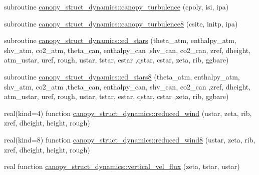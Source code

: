 \begin{DoxyCompactItemize}
\item 
subroutine \hyperlink{namespacecanopy__struct__dynamics_ac7eef4d24c3e07ccb461d418e32d466e}{canopy\+\_\+struct\+\_\+dynamics\+::canopy\+\_\+turbulence} (cpoly, isi, ipa)
\item 
subroutine \hyperlink{namespacecanopy__struct__dynamics_ab65e289b4069536fa3342bc3034db824}{canopy\+\_\+struct\+\_\+dynamics\+::canopy\+\_\+turbulence8} (csite, initp, ipa)
\item 
subroutine \hyperlink{namespacecanopy__struct__dynamics_aecb5209e48d8e43c4c1b214d31d3f7e2}{canopy\+\_\+struct\+\_\+dynamics\+::ed\+\_\+stars} (theta\+\_\+atm, enthalpy\+\_\+atm, shv\+\_\+atm, co2\+\_\+atm, theta\+\_\+can, enthalpy\+\_\+can                                                                                                           ,shv\+\_\+can, co2\+\_\+can, zref, dheight, atm\+\_\+ustar, uref, rough, ustar, tstar, estar                                                                                   ,qstar, cstar, zeta, rib, ggbare)
\item 
subroutine \hyperlink{namespacecanopy__struct__dynamics_a3a475e27ec763919f874021a412cf343}{canopy\+\_\+struct\+\_\+dynamics\+::ed\+\_\+stars8} (theta\+\_\+atm, enthalpy\+\_\+atm, shv\+\_\+atm, co2\+\_\+atm                                                                                                                                                                                                       ,theta\+\_\+can, enthalpy\+\_\+can, shv\+\_\+can, co2\+\_\+can                                                                                                                                                                                                       ,zref, dheight, atm\+\_\+ustar, uref, rough, ustar, tstar, estar, qstar, cstar                                                                                                   ,zeta, rib, ggbare)
\item 
real(kind=4) function \hyperlink{namespacecanopy__struct__dynamics_ae5504447c798d15053109bc4f8ff9346}{canopy\+\_\+struct\+\_\+dynamics\+::reduced\+\_\+wind} (ustar, zeta, rib, zref, dheight, height, rough)
\item 
real(kind=8) function \hyperlink{namespacecanopy__struct__dynamics_a4bfef6570fcebda5f22600fd0660ee0c}{canopy\+\_\+struct\+\_\+dynamics\+::reduced\+\_\+wind8} (ustar, zeta, rib, zref, dheight, height, rough)
\item 
real function \hyperlink{namespacecanopy__struct__dynamics_a126965a4161d05d71a5adbf82913401a}{canopy\+\_\+struct\+\_\+dynamics\+::vertical\+\_\+vel\+\_\+flux} (zeta, tstar, ustar)

\end{DoxyCompactItemize}
